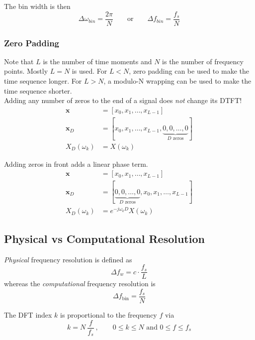 The bin width is then
\begin{equation*}
	\Delta\omega_{bin}=\frac{2\pi}{N} \qquad \text{or} \qquad \Delta f_{bin}=\frac{f_s}{N}
\end{equation*}


\subsubsection{Zero Padding}
Note that $L$ is the number of time moments and $N$ is the number of
frequency points. Mostly $L=N$ is used. For $L<N$, zero padding can be used
to make the time sequence longer. For $L>N$, a modulo-N wrapping can be
used to make the time sequence shorter. \\

Adding any number of zeros to the end of a signal does \emph{not} change its DTFT!
\begin{align*}
	\mathbf{x} &= [x_0,x_1,\ldots,x_{L-1}] \\
	\mathbf{x}_D &= [x_0,x_1,\ldots,x_{L-1},\underbrace{0,0,\ldots,0}_{D \text{ zeros}}] \\
	X_D(\omega_k) &= X(\omega_k)
\end{align*}

Adding zeros in front adds a linear phase term.
\begin{align*}
	\mathbf{x} &= [x_0,x_1,\ldots,x_{L-1}] \\
	\mathbf{x}_D &= [\underbrace{0,0,\ldots,0}_{D \text{ zeros}},x_0,x_1,\ldots,x_{L-1}] \\
	X_D(\omega_k) &= e^{-j \omega_k D} X(\omega_k)
\end{align*}

\subsection{Physical vs Computational Resolution}

\emph{Physical} frequency resolution is defined as
\begin{equation*}
	\Delta f_w = c \cdot \frac{f_s}{L}
\end{equation*}
whereas the \emph{computational} frequency resolution is
\begin{equation*}
	\Delta f_{\text{bin}} = \frac{f_s}{N}
\end{equation*}

The DFT index $k$ is proportional to the frequency $f$ via
\begin{equation*}
	k = N\:\frac{f}{f_s}\:, \qquad 0\leq k \leq N \text{ and } 0 \leq f \leq f_s
\end{equation*}

